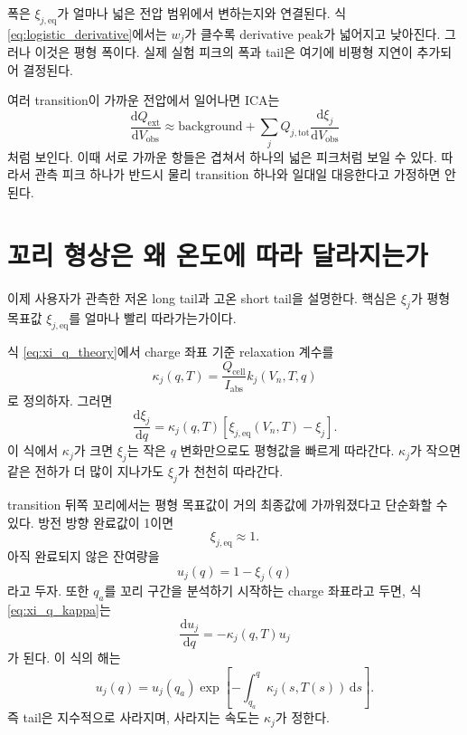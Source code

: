 \documentclass[11pt,a4paper]{article}
\newcommand{\dd}{\mathrm{d}}
\newcommand{\ext}{\mathrm{ext}}
\newcommand{\cell}{\mathrm{cell}}
\newcommand{\tot}{\mathrm{tot}}
\newcommand{\eqs}{\mathrm{eq}}
\newcommand{\obs}{\mathrm{obs}}
\newcommand{\absI}{I_{\mathrm{abs}}}
\begin{document}
폭은 \(\xi_{j,\eqs}\)가 얼마나 넓은 전압 범위에서 변하는지와 연결된다. 식 \eqref{eq:logistic_derivative}에서는 \(w_j\)가 클수록 derivative peak가 넓어지고 낮아진다. 그러나 이것은 평형 폭이다. 실제 실험 피크의 폭과 tail은 여기에 비평형 지연이 추가되어 결정된다.

여러 transition이 가까운 전압에서 일어나면 ICA는
\begin{equation}
\frac{\dd Q_{\ext}}{\dd V_{\obs}}
\approx
\text{background}
+
\sum_j
Q_{j,\tot}
\frac{\dd \xi_j}{\dd V_{\obs}}
\label{eq:multi_peak_sum}
\end{equation}
처럼 보인다. 이때 서로 가까운 항들은 겹쳐서 하나의 넓은 피크처럼 보일 수 있다. 따라서 관측 피크 하나가 반드시 물리 transition 하나와 일대일 대응한다고 가정하면 안 된다.

\section{꼬리 형상은 왜 온도에 따라 달라지는가}

이제 사용자가 관측한 저온 long tail과 고온 short tail을 설명한다. 핵심은 \(\xi_j\)가 평형 목표값 \(\xi_{j,\eqs}\)를 얼마나 빨리 따라가는가이다.

식 \eqref{eq:xi_q_theory}에서 charge 좌표 기준 relaxation 계수를
\begin{equation}
\kappa_j(q,T)
=
\frac{Q_{\cell}}{\absI}
k_j(V_n,T,q)
\label{eq:kappa_definition}
\end{equation}
로 정의하자. 그러면
\begin{equation}
\frac{\dd \xi_j}{\dd q}
=
\kappa_j(q,T)
\left[
\xi_{j,\eqs}(V_n,T)-\xi_j
\right].
\label{eq:xi_q_kappa}
\end{equation}
이 식에서 \(\kappa_j\)가 크면 \(\xi_j\)는 작은 \(q\) 변화만으로도 평형값을 빠르게 따라간다. \(\kappa_j\)가 작으면 같은 전하가 더 많이 지나가도 \(\xi_j\)가 천천히 따라간다.

transition 뒤쪽 꼬리에서는 평형 목표값이 거의 최종값에 가까워졌다고 단순화할 수 있다. 방전 방향 완료값이 1이면
\begin{equation}
\xi_{j,\eqs}\approx 1.
\label{eq:tail_target}
\end{equation}
아직 완료되지 않은 잔여량을
\begin{equation}
u_j(q)=1-\xi_j(q)
\label{eq:unrelaxed_fraction}
\end{equation}
라고 두자. 또한 \(q_a\)를 꼬리 구간을 분석하기 시작하는 charge 좌표라고 두면, 식 \eqref{eq:xi_q_kappa}는
\begin{equation}
\frac{\dd u_j}{\dd q}
=
-\kappa_j(q,T)u_j
\label{eq:tail_decay_ode}
\end{equation}
가 된다. 이 식의 해는
\begin{equation}
u_j(q)
=
u_j(q_a)
\exp\left[
-\int_{q_a}^{q}\kappa_j(s,T(s))\,\dd s
\right].
\label{eq:tail_decay_solution}
\end{equation}
즉 tail은 지수적으로 사라지며, 사라지는 속도는 \(\kappa_j\)가 정한다.
\end{document}
